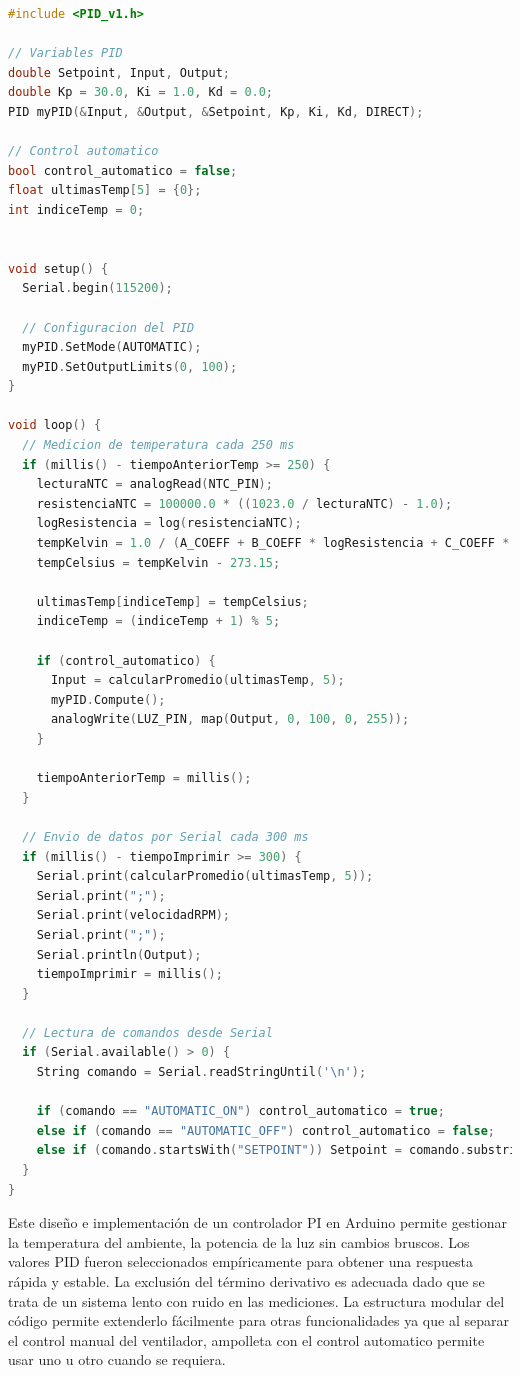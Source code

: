 \documentclass[spanish, a4paper, 11pt]{article}
\begin{document}
\begin{lstlisting}[language=C++]
#include <PID_v1.h>

// Variables PID
double Setpoint, Input, Output;
double Kp = 30.0, Ki = 1.0, Kd = 0.0;
PID myPID(&Input, &Output, &Setpoint, Kp, Ki, Kd, DIRECT);

// Control automatico
bool control_automatico = false;
float ultimasTemp[5] = {0};
int indiceTemp = 0;


void setup() {
  Serial.begin(115200);

  // Configuracion del PID
  myPID.SetMode(AUTOMATIC);
  myPID.SetOutputLimits(0, 100);
}

void loop() {
  // Medicion de temperatura cada 250 ms
  if (millis() - tiempoAnteriorTemp >= 250) {
    lecturaNTC = analogRead(NTC_PIN);
    resistenciaNTC = 100000.0 * ((1023.0 / lecturaNTC) - 1.0);
    logResistencia = log(resistenciaNTC);
    tempKelvin = 1.0 / (A_COEFF + B_COEFF * logResistencia + C_COEFF * pow(logResistencia, 3));
    tempCelsius = tempKelvin - 273.15;

    ultimasTemp[indiceTemp] = tempCelsius;
    indiceTemp = (indiceTemp + 1) % 5;

    if (control_automatico) {
      Input = calcularPromedio(ultimasTemp, 5);
      myPID.Compute();
      analogWrite(LUZ_PIN, map(Output, 0, 100, 0, 255));
    }

    tiempoAnteriorTemp = millis();
  }

  // Envio de datos por Serial cada 300 ms
  if (millis() - tiempoImprimir >= 300) {
    Serial.print(calcularPromedio(ultimasTemp, 5));
    Serial.print(";");
    Serial.print(velocidadRPM);
    Serial.print(";");
    Serial.println(Output);
    tiempoImprimir = millis();
  }

  // Lectura de comandos desde Serial
  if (Serial.available() > 0) {
    String comando = Serial.readStringUntil('\n');

    if (comando == "AUTOMATIC_ON") control_automatico = true;
    else if (comando == "AUTOMATIC_OFF") control_automatico = false;
    else if (comando.startsWith("SETPOINT")) Setpoint = comando.substring(9).toDouble();
  }
}
\end{lstlisting}


Este diseño e implementación de un controlador PI en Arduino permite gestionar la temperatura del ambiente, la potencia de la luz sin cambios bruscos. Los valores PID fueron seleccionados empíricamente para obtener una respuesta rápida y estable. La exclusión del término derivativo es adecuada dado que se trata de un sistema lento con ruido en las mediciones. La estructura modular del código permite extenderlo fácilmente para otras funcionalidades ya que al separar el control manual del ventilador, ampolleta con el control automatico permite usar uno u otro cuando se requiera.
\end{document}
